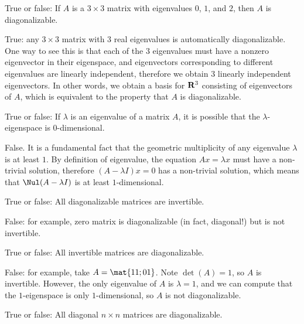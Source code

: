 \begin{problems}
%

\problem %
True or false: If $A$ is a $3 \times 3$ matrix with eigenvalues $0$, $1$, and $2$, then
$A$ is diagonalizable.

\begin{solution}
  True: any $3 \times 3$ matrix with $3$ real eigenvalues is automatically
  diagonalizable.  One way to see this is that each of the $3$ eigenvalues must
  have a nonzero eigenvector in their eigenspace, and eigenvectors corresponding
  to different eigenvalues are linearly independent, therefore we obtain $3$
  linearly independent eigenvectors.  In other words, we obtain a basis for
  ${\bf R}^{3}$ consisting of eigenvectors of $A$, which is equivalent to the
  property that $A$ is diagonalizable.
\end{solution}


\problem %
True or false: If $\lambda$ is an eigenvalue of a matrix $A$, it is possible
that the $\lambda$-eigenspace is $0$-dimensional.

\begin{solution}
  False.  It is a fundamental fact that the geometric multiplicity of any
  eigenvalue $\lambda$ is at least $1$.  By definition of eigenvalue, the
  equation $Ax = \lambda x$ must have a non-trivial solution, therefore
  $(A-\lambda I)x = 0$ has a non-trivial solution, which means that
  $\Nul(A-\lambda I)$ is at least $1$-dimensional.
\end{solution}

\problem %
True or false: All diagonalizable matrices are invertible.

\begin{solution}
  False: for example, zero matrix is diagonalizable (in fact, diagonal!) but is
  not invertible.
\end{solution}

\problem %
True or false: All invertible matrices are diagonalizable.   

\begin{solution}
  False: for example, take $A = \mat{1 1; 0 1}$. Note $\det(A) = 1$, so $A$ is
  invertible.  However, the only eigenvalue of $A$ is $\lambda = 1$, and we can
  compute that the $1$-eigenspace is only $1$-dimensional, so $A$ is not
  diagonalizable.
\end{solution}

\problem %
True or false: All diagonal $n \times n$ matrices are diagonalizable.


\end{problems}
